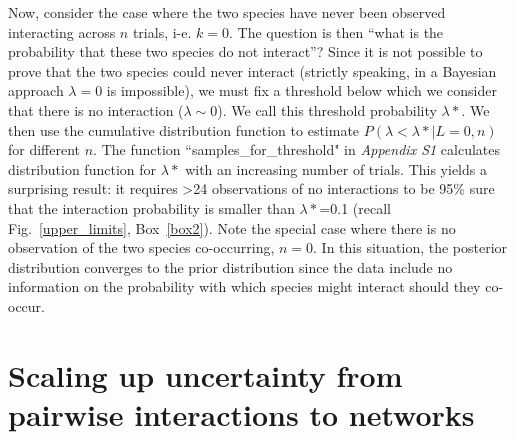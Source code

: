 \documentclass[12pt]{article}
\begin{document}
    Now, consider the case where the two species have never been observed interacting across $n$ trials, i-e. $k=0$. The question is then ``what is the probability that these two species do not interact''? Since it is not possible to prove that the two species could never interact (strictly speaking, in a Bayesian approach $\lambda=0$ is impossible), we must fix a threshold below which we consider that there is no interaction ($\lambda \sim 0$). We call this threshold probability $\lambda*$. We then use the cumulative distribution function to estimate $P(\lambda<\lambda*|L=0,n)$ for different $n$. The function ``samples\_for\_threshold" in \emph{Appendix S1} calculates distribution function for $\lambda*$ with an increasing number of trials. This yields a surprising result: it requires \textgreater24 observations of no interactions to be 95\% sure that the interaction probability is smaller than $\lambda*$=0.1 (recall Fig.~\ref{upper_limits}, Box~\ref{box2}). Note the special case where there is no observation of the two species co-occurring, $n = 0$.  In this situation, the posterior distribution converges to the prior distribution since the data include no information on the probability with which species might interact should they co-occur.


\section*{Scaling up uncertainty from pairwise interactions to networks}
\end{document}
